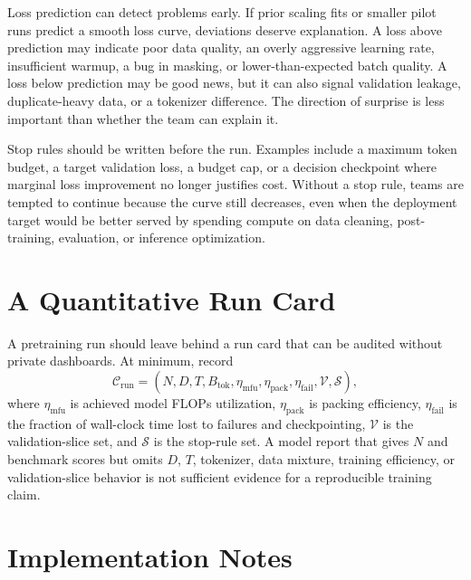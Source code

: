 Loss prediction can detect problems early. If prior scaling fits or smaller pilot runs predict a smooth loss curve, deviations deserve explanation. A loss above prediction may indicate poor data quality, an overly aggressive learning rate, insufficient warmup, a bug in masking, or lower-than-expected batch quality. A loss below prediction may be good news, but it can also signal validation leakage, duplicate-heavy data, or a tokenizer difference. The direction of surprise is less important than whether the team can explain it.

Stop rules should be written before the run. Examples include a maximum token budget, a target validation loss, a budget cap, or a decision checkpoint where marginal loss improvement no longer justifies cost. Without a stop rule, teams are tempted to continue because the curve still decreases, even when the deployment target would be better served by spending compute on data cleaning, post-training, evaluation, or inference optimization.

\section{A Quantitative Run Card}
\label{sec:quantitative-run-card}

A pretraining run should leave behind a run card that can be audited without private dashboards. At minimum, record
\begin{equation}
  \mathcal{C}_{\mathrm{run}}
  =
  (N, D, T, B_{\mathrm{tok}}, \eta_{\mathrm{mfu}}, \eta_{\mathrm{pack}},
  \eta_{\mathrm{fail}}, \mathcal{V}, \mathcal{S}),
\end{equation}
where $\eta_{\mathrm{mfu}}$ is achieved model FLOPs utilization, $\eta_{\mathrm{pack}}$ is packing efficiency, $\eta_{\mathrm{fail}}$ is the fraction of wall-clock time lost to failures and checkpointing, $\mathcal{V}$ is the validation-slice set, and $\mathcal{S}$ is the stop-rule set. A model report that gives $N$ and benchmark scores but omits $D$, $T$, tokenizer, data mixture, training efficiency, or validation-slice behavior is not sufficient evidence for a reproducible training claim.

\section{Implementation Notes}
\label{sec:optimization-implementation-notes}

